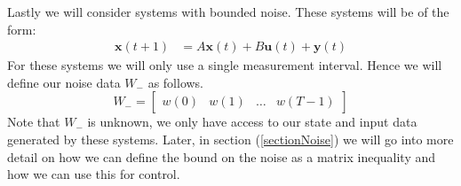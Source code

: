 Lastly we will consider systems with bounded noise. These systems will be of the form:
\begin{align} \label{isnSystem}
	\mathbf{x}(t+1) &= A \mathbf{x}(t) + B \mathbf{u}(t) + \mathbf{y}(t)
\end{align}
For these systems we will only use a single measurement interval. Hence we will define our noise data $W_-$ as follows.
\[ W_- = \begin{bmatrix} w(0) & w(1) & \dots & w(T-1)	\end{bmatrix} \]
Note that $W_-$ is unknown, we only have access to our state and input data generated by these systems. Later, in section (\ref{sectionNoise}) we will go into more detail on how we can define the bound on the noise as a matrix inequality and how we can use this for control.









